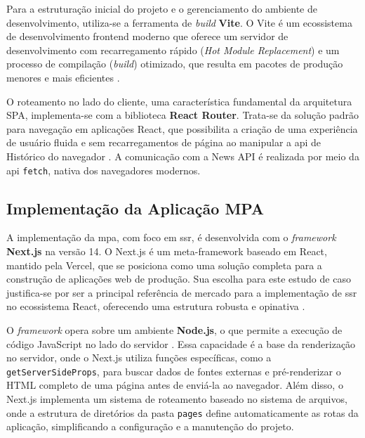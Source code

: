 Para a estruturação inicial do projeto e o gerenciamento do ambiente de desenvolvimento, utiliza-se a ferramenta de \textit{build} \textbf{Vite}. O Vite é um ecossistema de desenvolvimento frontend moderno que oferece um servidor de desenvolvimento com recarregamento rápido (\textit{Hot Module Replacement}) e um processo de compilação (\textit{build}) otimizado, que resulta em pacotes de produção menores e mais eficientes \cite{vite_docs}.

O roteamento no lado do cliente, uma característica fundamental da arquitetura SPA, implementa-se com a biblioteca \textbf{React Router}. Trata-se da solução padrão para navegação em aplicações React, que possibilita a criação de uma experiência de usuário fluida e sem recarregamentos de página ao manipular a \acrshort{api} de Histórico do navegador \cite{react_router_docs}. A comunicação com a News API é realizada por meio da \acrshort{api} \texttt{fetch}, nativa dos navegadores modernos.

\subsection{Implementação da Aplicação MPA}
\label{ssec:implementacao_mpa}

A implementação da \acrfull{mpa}, com foco em \acrfull{ssr}, é desenvolvida com o \emph{framework} \textbf{Next.js} na versão 14. O Next.js é um meta-framework baseado em React, mantido pela Vercel, que se posiciona como uma solução completa para a construção de aplicações web de produção. Sua escolha para este estudo de caso justifica-se por ser a principal referência de mercado para a implementação de \acrshort{ssr} no ecossistema React, oferecendo uma estrutura robusta e opinativa \cite{nextjs2024}.

O \emph{framework} opera sobre um ambiente \textbf{Node.js}, o que permite a execução de código JavaScript no lado do servidor \cite{nodejs2025}. Essa capacidade é a base da renderização no servidor, onde o Next.js utiliza funções específicas, como a \texttt{getServerSideProps}, para buscar dados de fontes externas e pré-renderizar o HTML completo de uma página antes de enviá-la ao navegador. Além disso, o Next.js implementa um sistema de roteamento baseado no sistema de arquivos, onde a estrutura de diretórios da pasta \texttt{pages} define automaticamente as rotas da aplicação, simplificando a configuração e a manutenção do projeto.